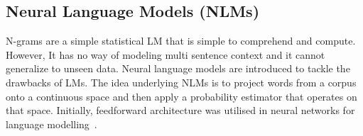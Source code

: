 \subsection{Neural Language Models (NLMs)}
N-grams are a simple statistical LM that is simple to comprehend and compute. However, It has no way of modeling multi sentence context and it cannot generalize to unseen data. 
Neural language models are introduced to tackle the drawbacks of LMs.
The idea underlying NLMs is to project words from a corpus onto a continuous space and then apply a probability estimator that operates on that space. Initially, feedforward architecture was utilised in neural networks for language modelling~\cite{advancesnlm}.





